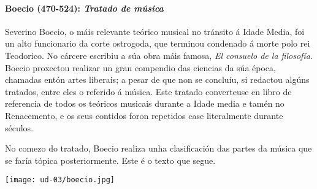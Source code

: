 %
%
\begin{multicols}{2}
%
%
\paragraph{Boecio (470-524): \emph{Tratado de música}}\label{Boecio-tratado}
%
Severino Boecio, o máis relevante teórico musical no tránsito á Idade Media, foi un alto funcionario da corte ostrogoda, que terminou condenado á morte polo rei Teodorico. No cárcere escribiu a súa obra máis famosa, \emph{El consuelo de la filosofía}.\\
Boecio proxectou realizar un gran compendio das ciencias da súa época, chamadas entón artes liberais; a pesar de que non se concluíu, si redactou algúns tratados, entre eles o referido á música. Este tratado converteuse en libro de referencia de todos os teóricos musicais durante a Idade media e tamén no Renacemento, e os seus contidos foron repetidos case literalmente durante séculos.

No comezo do tratado, Boecio realiza unha clasificación das partes da música que se faría tópica posteriormente. Este é o texto que segue.
%
%
\begin{Figura}
  \centering
  \texttt{[image: ud-03/boecio.jpg]}
  \label{fig:Severino-Boecio}
\end{Figura}
%
\end{multicols}
%
\vspace*{0.05cm}
